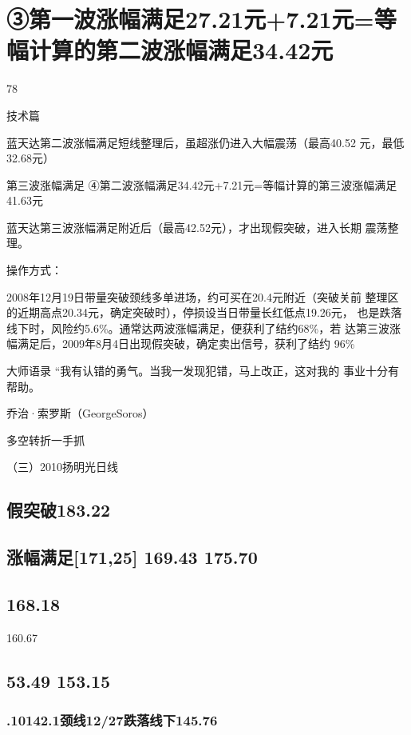 \documentclass{article}
\begin{document}
\section{③第一波涨幅满足27.21元+7.21元=等幅计算的第二波涨幅满足34.42元}

78

\clearpage

技术篇

蓝天达第二波涨幅满足短线整理后，虽超涨仍进入大幅震荡（最高40.52 元，最低32.68元）

第三波涨幅满足 ④第二波涨幅满足34.42元+7.21元=等幅计算的第三波涨幅满足41.63元

蓝天达第三波涨幅满足附近后（最高42.52元），才出现假突破，进入长期 震荡整理。

操作方式：

2008年12月19日带量突破颈线多单进场，约可买在20.4元附近（突破关前 整理区的近期高点20.34元，确定突破时），停损设当日带量长红低点19.26元， 也是跌落线下时，风险约5.6\%。通常达两波涨幅满足，便获利了结约68\%，若 达第三波涨幅满足后，2009年8月4日出现假突破，确定卖出信号，获利了结约 96\%

大师语录 “我有认错的勇气。当我一发现犯错，马上改正，这对我的 事业十分有帮助。

乔治·索罗斯（GeorgeSoros）

\clearpage

多空转折一手抓

（三）2010扬明光日线

\subsection{假突破183.22}

\subsection{涨幅满足[171,25] 169.43 175.70}

\subsection{168.18}

160.67

\subsection{53.49 153.15}

\subsubsection{.10142.1颈线12/27跌落线下145.76}
\end{document}
